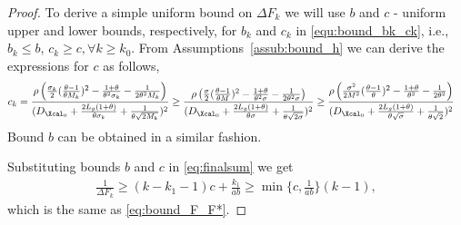 \documentclass[11pt]{article}
\numberwithin{equation}{section}
\begin{document}
\begin{proof}
	To derive  a simple uniform bound on  $\Delta F_{k }$ we will use  $b$ and $c$ - uniform upper and lower bounds, respectively, for $b_k$ and $c_k$ in \eqref{equ:bound_bk_ck}, i.e., $b_k \leq b$, $c_k \geq c, \forall k\geq k_0$. 
	From Assumptions~\ref{assub:bound_h} we can derive the expressions for $c$ as follows,
	\begin{align*}
	    c_k
	    &= \frac{\rho \left( \frac{\sigma_k}{2}(\frac{\theta-1}{\theta M_k})^2 - \frac{1+\theta}{\theta^2\sigma_k}- \frac{1}{2\theta^2M_k} \right)}{(D_{\Xcal_0} + \frac{2L_g(1+\theta)}{\theta\sigma_k} + \frac{1}{\theta\sqrt{2M_k}})^2} 
	    \geq \frac{\rho \left( \frac{\sigma}{2}(\frac{\theta-1}{\theta M})^2 - \frac{1+\theta}{\theta^2\sigma}- \frac{1}{2\theta^2\sigma} \right)}{(D_{\Xcal_0} + \frac{2L_g(1+\theta)}{\theta\sigma} + \frac{1}{\theta\sqrt{2\sigma}})^2} 
	    \geq \frac{\rho \left( \frac{\sigma^2}{2M^2}(\frac{\theta-1}{\theta})^2 - \frac{1+\theta}{\theta^2}- \frac{1}{2\theta^2} \right)}{(D_{\Xcal_0} + \frac{2L_g(1+\theta)}{\theta\sqrt{\sigma}} + \frac{1}{\theta\sqrt{2}})^2} 
	\end{align*}
	Bound $b$ can be obtained in a similar fashion.

Substituting bounds $b$ and $c$ in \eqref{eq:finalsum} we get 
\begin{align*}
	    \frac{1}{\Delta F_{k }} \geq (k-k_1-1)c+ \frac{k_1} {a b}\geq \min\{c, \frac{1} {a b}\}(k-1),
	    \end{align*}
 which is the same as   \eqref{eq:bound_F_F*}.


	
\end{proof}




\end{document}
